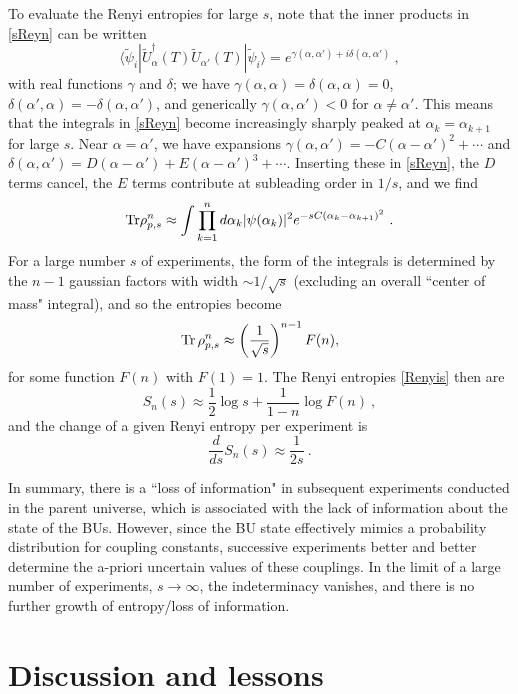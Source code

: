 \documentclass[12pt]{article}
\numberwithin{equation}{section}
\newcommand{\beq}{\begin{equation}}
\newcommand{\eeq}{\end{equation}}
\newcommand{\Tr}{{\rm Tr}}
\begin{document}
To evaluate the Renyi entropies for large $s$, note that
the inner products in \eqref{sReyn} can be written
\beq
\langle \tilde \psi_i| \tilde U^\dagger_{\alpha}(T) \tilde U_{\alpha'}(T) |\tilde \psi_i\rangle = e^{\gamma(\alpha,\alpha')+i \delta(\alpha,\alpha')}\ ,
\eeq
with real functions $\gamma$ and $\delta$; we have $\gamma(\alpha,\alpha)=\delta(\alpha,\alpha)=0$, $\delta(\alpha',\alpha)= -\delta(\alpha,\alpha')$, and generically $\gamma(\alpha,\alpha')<0$ for $\alpha\neq\alpha'$.  This means that the integrals in \eqref{sReyn} become increasingly sharply peaked at $\alpha_k=\alpha_{k+1}$ for large $s$.  
Near $\alpha=\alpha'$, we have  expansions $\gamma(\alpha,\alpha') = -C(\alpha-\alpha')^2 +\cdots$ and $\delta(\alpha,\alpha') = D(\alpha-\alpha') + E(\alpha-\alpha')^3 + \cdots$.  Inserting these in \eqref{sReyn}, the $D$ terms cancel, the $E$ terms contribute at subleading order in $1/s$, and we find
\beq
\Tr \rho_{p,s}^n \approx \int\prod_{k=1}^n  d\alpha_k | \psi(\alpha_k)|^2  e^{-sC(\alpha_k-\alpha_{k+1})^2} \ .
\eeq
For a large number  $s$ of experiments, the form of the integrals is determined by the $n-1$ gaussian factors with width $\sim 1/\sqrt s$ (excluding an overall ``center of mass" integral), and so the entropies become
\beq
\Tr\, \rho_{p,s}^n \approx \left(\frac{1}{\sqrt s}\right)^{n-1} F(n), 
\eeq
for some function $F(n)$ with $F(1)=1$.  
The Renyi entropies \eqref{Renyis} then are
\beq
S_n(s) \approx \frac{1}{2} \log s + \frac{1}{1-n} \log F(n)\ ,
\eeq
and the change of a given Renyi entropy per experiment is 
\beq
\frac{d}{ds} S_n(s) \approx \frac{1}{2s}\ .
\eeq

In summary, there is a ``loss of information" in subsequent experiments conducted in the parent universe, which is associated with the lack of information about the state of the BUs.  However, since the BU state effectively mimics a probability distribution for coupling constants, successive experiments better and better determine the a-priori uncertain values of these couplings.  In the limit of a large number of experiments, $s\rightarrow\infty$, the indeterminacy vanishes, and there is no further growth of entropy/loss of information.


\section{Discussion and lessons}
\end{document}
